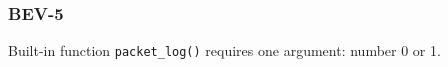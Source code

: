 \subsubsection{BEV-5}\label{sec:error_code_bev_5}

Built-in function \texttt{packet\_log()} requires one argument: number 0 or 1.


